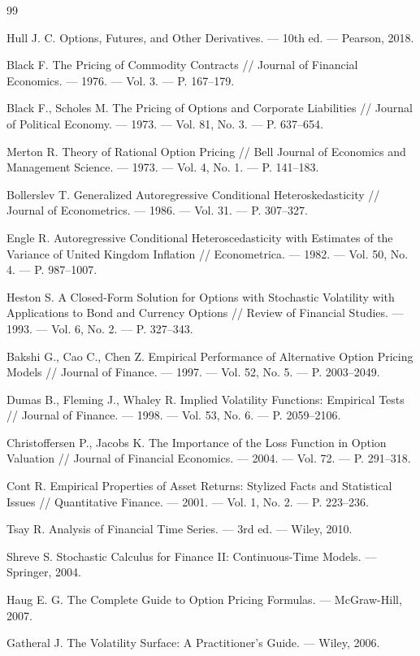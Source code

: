 \documentclass[11pt,a4paper]{article}
\begin{document}
\begin{thebibliography}{99}

Hull J. C. Options, Futures, and Other Derivatives. --- 10th ed. --- Pearson, 2018.

Black F. The Pricing of Commodity Contracts // Journal of Financial Economics. --- 1976. --- Vol. 3. --- P. 167--179.

Black F., Scholes M. The Pricing of Options and Corporate Liabilities // Journal of Political Economy. --- 1973. --- Vol. 81, No. 3. --- P. 637--654.

Merton R. Theory of Rational Option Pricing // Bell Journal of Economics and Management Science. --- 1973. --- Vol. 4, No. 1. --- P. 141--183.

Bollerslev T. Generalized Autoregressive Conditional Heteroskedasticity // Journal of Econometrics. --- 1986. --- Vol. 31. --- P. 307--327.

Engle R. Autoregressive Conditional Heteroscedasticity with Estimates of the Variance of United Kingdom Inflation // Econometrica. --- 1982. --- Vol. 50, No. 4. --- P. 987--1007.

Heston S. A Closed-Form Solution for Options with Stochastic Volatility with Applications to Bond and Currency Options // Review of Financial Studies. --- 1993. --- Vol. 6, No. 2. --- P. 327--343.

Bakshi G., Cao C., Chen Z. Empirical Performance of Alternative Option Pricing Models // Journal of Finance. --- 1997. --- Vol. 52, No. 5. --- P. 2003--2049.

Dumas B., Fleming J., Whaley R. Implied Volatility Functions: Empirical Tests // Journal of Finance. --- 1998. --- Vol. 53, No. 6. --- P. 2059--2106.

Christoffersen P., Jacobs K. The Importance of the Loss Function in Option Valuation // Journal of Financial Economics. --- 2004. --- Vol. 72. --- P. 291--318.

Cont R. Empirical Properties of Asset Returns: Stylized Facts and Statistical Issues // Quantitative Finance. --- 2001. --- Vol. 1, No. 2. --- P. 223--236.

Tsay R. Analysis of Financial Time Series. --- 3rd ed. --- Wiley, 2010.

Shreve S. Stochastic Calculus for Finance II: Continuous-Time Models. --- Springer, 2004.

Haug E. G. The Complete Guide to Option Pricing Formulas. --- McGraw-Hill, 2007.

Gatheral J. The Volatility Surface: A Practitioner's Guide. --- Wiley, 2006.

\end{thebibliography}
\end{document}
